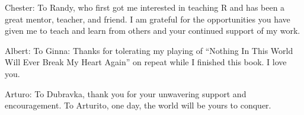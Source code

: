 \cleardoublepage\newpage
\thispagestyle{empty}

\vspace*{2in}

\begin{center}
Chester: To Randy, who first got me interested in teaching R and has been a great mentor, teacher, and friend. I am grateful for the opportunities you have given me to teach and learn from others and your continued support of my work.

\vspace{0.3in}

Albert:  \selectfont To Ginna: Thanks for tolerating my playing of ``Nothing In This World Will Ever Break My Heart Again'' on repeat while I finished this book. I love you.

\vspace{0.3in}

Arturo: To Dubravka, thank you for your unwavering support and encouragement. To Arturito, one day, the world will be yours to conquer.


\end{center}

\setlength{\abovedisplayskip}{-5pt}
\setlength{\abovedisplayshortskip}{-5pt}
